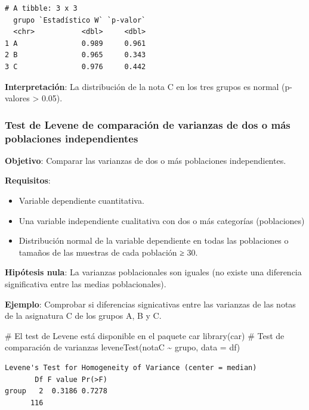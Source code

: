 \documentclass[
  spanish,
  a4paper,
]{scrreport}
\newenvironment{Shaded}{\begin{snugshade}}{\end{snugshade}}
\newcommand{\AttributeTok}[1]{\textcolor[rgb]{0.40,0.45,0.13}{#1}}
\newcommand{\CommentTok}[1]{\textcolor[rgb]{0.37,0.37,0.37}{#1}}
\newcommand{\FunctionTok}[1]{\textcolor[rgb]{0.28,0.35,0.67}{#1}}
\newcommand{\NormalTok}[1]{\textcolor[rgb]{0.00,0.23,0.31}{#1}}
\newcommand{\SpecialCharTok}[1]{\textcolor[rgb]{0.37,0.37,0.37}{#1}}
\providecommand{\tightlist}{%
  \setlength{\itemsep}{0pt}\setlength{\parskip}{0pt}}
\theoremstyle{definition}
\theoremstyle{definition}
\theoremstyle{remark}
\begin{document}
\begin{verbatim}
# A tibble: 3 x 3
  grupo `Estadístico W` `p-valor`
  <chr>           <dbl>     <dbl>
1 A               0.989     0.961
2 B               0.965     0.343
3 C               0.976     0.442
\end{verbatim}

\textbf{Interpretación}: La distribución de la nota C en los tres grupos
es normal (p-valores \textgreater{} 0.05).

\subsubsection{Test de Levene de comparación de varianzas de dos o más
poblaciones
independientes}\label{test-de-levene-de-comparaciuxf3n-de-varianzas-de-dos-o-muxe1s-poblaciones-independientes}

\textbf{Objetivo}: Comparar las varianzas de dos o más poblaciones
independientes.

\textbf{Requisitos}:

\begin{itemize}
\tightlist
\item
  Variable dependiente cuantitativa.
\item
  Una variable independiente cualitativa con dos o más categorías
  (poblaciones)
\item
  Distribución normal de la variable dependiente en todas las
  poblaciones o tamaños de las muestras de cada población ≥ 30.
\end{itemize}

\textbf{Hipótesis nula}: La varianzas poblacionales son iguales (no
existe una diferencia significativa entre las medias poblacionales).

\textbf{Ejemplo}: Comprobar si diferencias signicativas entre las
varianzas de las notas de la asignatura C de los grupos A, B y C.

\begin{Shaded}
\begin{Highlighting}[]
\CommentTok{\# El test de Levene está disponible en el paquete car}
\FunctionTok{library}\NormalTok{(car)}
\CommentTok{\# Test de comparación de varianzas}
\FunctionTok{leveneTest}\NormalTok{(notaC }\SpecialCharTok{\textasciitilde{}}\NormalTok{ grupo, }\AttributeTok{data =}\NormalTok{ df)}
\end{Highlighting}
\end{Shaded}

\begin{verbatim}
Levene's Test for Homogeneity of Variance (center = median)
       Df F value Pr(>F)
group   2  0.3186 0.7278
      116               
\end{verbatim}
\end{document}
